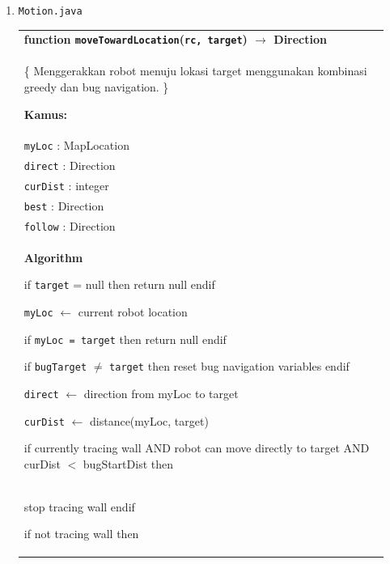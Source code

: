 \documentclass{article}
\newenvironment{pseudobox}
{
\centering
\begin{longtable}{|p{0.94\linewidth}|}
\hline
}
{
\\ \hline
\end{longtable}
\vspace{0.05cm}
}
\begin{document}
\begin{enumerate}[label=\alph*.]
\item \texttt{Motion.java}

\begin{pseudobox}
\textbf{function \texttt{moveTowardLocation}(\texttt{rc, target}) $\rightarrow$ Direction} \\
\{ Menggerakkan robot menuju lokasi target menggunakan kombinasi greedy dan bug navigation. \}

\textbf{Kamus:} \\
\hspace*{1.5em}\texttt{myLoc} : MapLocation \\
\hspace*{1.5em}\texttt{direct} : Direction \\
\hspace*{1.5em}\texttt{curDist} : integer \\
\hspace*{1.5em}\texttt{best} : Direction \\
\hspace*{1.5em}\texttt{follow} : Direction \\

\textbf{Algorithm}

\hspace*{1.5em}if \texttt{target} = null then return null endif

\hspace*{1.5em}\texttt{myLoc} $\leftarrow$ current robot location

\hspace*{1.5em}if \texttt{myLoc = target} then return null endif

\hspace*{1.5em}if \texttt{bugTarget} $\neq$ \texttt{target} then reset bug navigation variables endif

\hspace*{1.5em}\texttt{direct} $\leftarrow$ direction from myLoc to target

\hspace*{1.5em}\texttt{curDist} $\leftarrow$ distance(myLoc, target)

\hspace*{1.5em}if currently tracing wall AND robot can move directly to target AND curDist $<$ bugStartDist then \\
\hspace*{3em}stop tracing wall
\hspace*{1.5em}endif

\hspace*{1.5em}if not tracing wall then


\end{pseudobox}
\end{enumerate}
\end{document}
